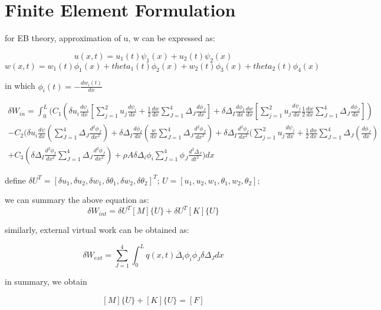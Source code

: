 \documentclass[11pt]{article}
\begin{document}
\section{Finite Element Formulation}

for EB theory, approximation of u, w can be expressed as:

$$ u(x,t) = u_1(t) \psi_1(x) + u_2(t) \psi_2(x) $$
$$ w(x,t) = w_1(t) \phi_1(x) + theta_1(t) \phi_2(x) + w_2(t) \phi_3(x) + theta_2(t) \phi_4(x) $$

in which  $ \phi _i(t) = - \frac{d w_i(t)}{dx} $


\begin{multline}
\delta W_{in} = \int_0^L (C_1( \delta u_i \frac{d \psi_i}{dx}[\sum_{j=1}^2 u_j \frac{d \psi_i}{dx} + \frac{1}{2} \frac{dw}{dx} \sum_{J=1}^4 \Delta_J \frac{d \phi_J}{dx}] 
+ \delta \Delta_I \frac{d \phi_I }{dx} \frac{dw}{dx}[\sum_{j=1}^2 u_j \frac{d \psi_j}{dx} \frac{1}{2} \frac{dw}{dx} \sum_{J=1}^4 \Delta_J \frac{d \phi_J}{dx}])  \\
 - C_2( \delta u_i \frac{d \psi}{dx}(\sum_{J=1}^4 \Delta_J \frac{d^2 \phi_J}{dx^2}) + \delta \Delta_I \frac{d \phi_I}{dx} (\frac{w}{dx} \sum_{J=1}^4 \Delta_J \frac{d^2 \phi_J}{dx^2}) + \delta \Delta_I \frac{d^2 \phi_I}{dx^2} ( \sum_{j=1}^2 u_j \frac{d \psi_j}{dx} + \frac{1}{2} \frac{dw}{dx} \sum_{J=1}^4\Delta_J (\frac{d \phi_J}{dx}) \\
+ C_3( \delta \Delta_I \frac{d^2 \phi_I}{dx^2} \sum_{J=1}^4 \Delta_J \frac{d^2 \phi_J}{dx^2}) + \rho A \delta \Delta_i \phi_i \sum_{J=1}^4 \phi_J \frac{d^2 \Delta_J}{dt^2})dx
\end{multline}



define $ \delta U^T = [ \delta u_1, \delta u_2, \delta w_1, \delta \theta_1, \delta w_2, \delta \theta_2]^T$; $ U = [u_1, u_2, w_1, \theta_1, w_2, \theta_2]; $

we can summary the above equation as:
$$ \delta W_{int} = \delta U^T [M] \{\ddot{U} \} + \delta U^T [K] \{U\} $$

similarly, external virtual work can be obtained as:

$$ \delta W_{ext} = \sum_{J=1}^4 \int_0^L q(x,t) \ddot{\Delta_i} \phi_i \phi_J \delta \Delta_J dx $$

in summary, we  obtain

$$ [M]\{\ddot{U}\} + [K]\{U\} = [F] $$
\end{document}
